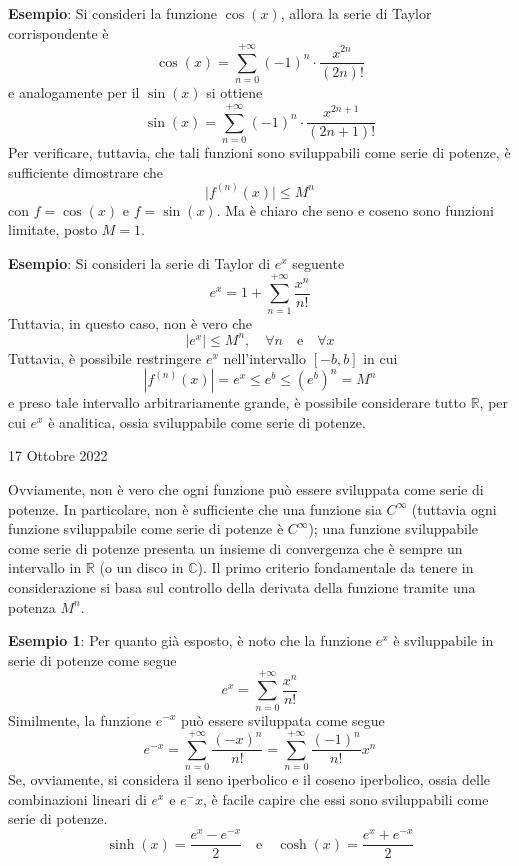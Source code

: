 \documentclass[a4paper]{extarticle}
\begin{document}
\vspace{1em}
\noindent
\textbf{Esempio}: Si consideri la funzione $\cos(x)$, allora la serie di Taylor corrispondente è
\[\cos(x) = \sum_{n=0}^{+\infty} (-1)^n \cdot \frac{x^{2n}}{(2n)!}\]
e analogamente per il $\sin(x)$ si ottiene
\[\sin(x) = \sum_{n=0}^{+\infty} (-1)^n \cdot \frac{x^{2n+1}}{(2n+1)!}\]
Per verificare, tuttavia, che tali funzioni sono sviluppabili come serie di potenze, è sufficiente dimostrare che
\[\vert f^{(n)}(x) \vert \leq M^n\]
con $f=\cos(x)$ e $f=\sin(x)$. Ma è chiaro che seno e coseno sono funzioni limitate, posto $M=1$.

\vspace{1em}
\noindent
\textbf{Esempio}: Si consideri la serie di Taylor di $e^x$ seguente
\[e^x=1+\sum_{n=1}^{+\infty} \frac{x^n}{n!}\]
Tuttavia, in questo caso, non è vero che
\[\left \vert e^x \right \vert \leq M^n, \hspace{1em} \forall n \hspace{1em} \text{e} \hspace{1em} \forall x\]
Tuttavia, è possibile restringere $e^x$ nell'intervallo $[-b,b]$ in cui
\[\left \vert f^{(n)}(x) \right \vert = e^x \leq e^b \leq (e^b)^n = M^n\]
e preso tale intervallo arbitrariamente grande, è possibile considerare tutto $\mathbb{R}$, per cui $e^x$ è analitica, ossia sviluppabile come serie di potenze.

\newpage
\begin{center}
    17 Ottobre 2022
\end{center}
Ovviamente, non è vero che ogni funzione può essere sviluppata come serie di potenze. In particolare, non è sufficiente che una funzione sia $C^{\infty}$ (tuttavia ogni funzione sviluppabile come serie di potenze è $C^\infty$); una funzione sviluppabile come serie di potenze presenta un insieme di convergenza che è sempre un intervallo in $\mathbb{R}$ (o un disco in $\mathbb{C}$). Il primo criterio fondamentale da tenere in considerazione si basa sul controllo della derivata della funzione tramite una potenza $M^n$.

\vspace{1em}
\noindent
\textbf{Esempio 1}: Per quanto già esposto, è noto che la funzione $e^x$ è sviluppabile in serie di potenze come segue
\[e^x=\sum_{n=0}^{+\infty} \dfrac{x^n}{n!}\]
Similmente, la funzione $e^{-x}$ può essere sviluppata come segue
\[e^{-x} = \sum_{n=0}^{+\infty} \dfrac{(-x)^n}{n!} = \sum_{n=0}^{+\infty} \frac{(-1)^n}{n!} x^n\]
Se, ovviamente, si considera il seno iperbolico e il coseno iperbolico, ossia delle combinazioni lineari di $e^x$ e $e^-x$, è facile capire che essi sono sviluppabili come serie di potenze.
\[\sinh(x) = \dfrac{e^x-e^{-x}}{2} \hspace{1em} \text{e} \hspace{1em} \cosh(x) = \dfrac{e^x+e^{-x}}{2}\]
\end{document}
